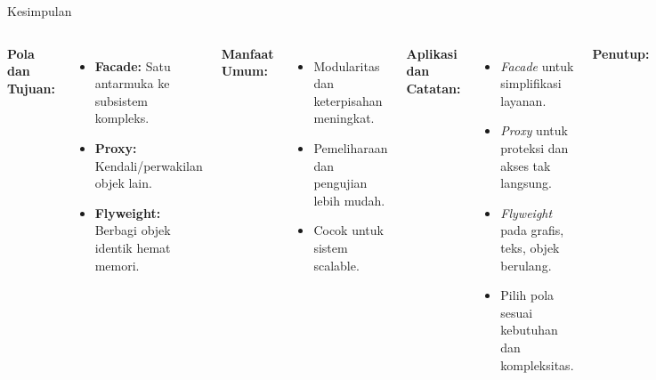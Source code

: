 \documentclass[aspectratio=169, table]{beamer}
\begin{document}
\begin{frame}{Kesimpulan}
	\vspace{10pt}
	\begin{columns}[T]
		\textbf{Pola dan Tujuan:}
		\begin{itemize}
			\item \textbf{Facade:} Satu antarmuka ke subsistem kompleks.
			\item \textbf{Proxy:} Kendali/perwakilan objek lain.
			\item \textbf{Flyweight:} Berbagi objek identik hemat memori.
		\end{itemize}
		
		\vspace{4pt}
		\textbf{Manfaat Umum:}
		\begin{itemize}
			\item Modularitas dan keterpisahan meningkat.
			\item Pemeliharaan dan pengujian lebih mudah.
			\item Cocok untuk sistem scalable.
		\end{itemize}
		
		\textbf{Aplikasi dan Catatan:}
		\begin{itemize}
			\item \textit{Facade} untuk simplifikasi layanan.
			\item \textit{Proxy} untuk proteksi dan akses tak langsung.
			\item \textit{Flyweight} pada grafis, teks, objek berulang.
			\item Pilih pola sesuai kebutuhan dan kompleksitas.
		\end{itemize}
		
		\vspace{4pt}
		\textbf{Penutup:}
		\begin{itemize}
			\item Pola ini memperkuat desain berorientasi objek.
			\item Gunakan untuk sistem fleksibel dan efisien.
		\end{itemize}
	\end{columns}
\end{frame}
\end{document}
